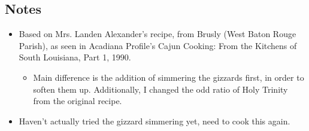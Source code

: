 \begin{multicols}{2}
\begin{enumerate}
\end{enumerate}

\subsection*{Notes}
\begin{itemize}
    \item Based on Mrs. Landen Alexander’s recipe, from Brusly (West Baton Rouge Parish), as seen in Acadiana Profile’s Cajun Cooking: From the Kitchens of South Louisiana, Part 1, 1990.
    \begin{itemize}
        \item Main difference is the addition of simmering the gizzards first, in order to soften them up. Additionally, I changed the odd ratio of Holy Trinity from the original recipe.
    \end{itemize}
    \item Haven’t actually tried the gizzard simmering yet, need to cook this again.
\end{itemize}
\end{multicols}
\clearpage
